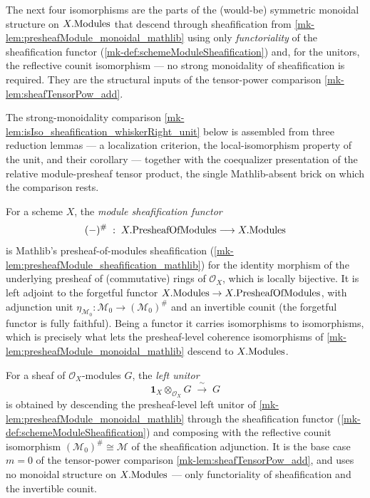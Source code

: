 The next four isomorphisms are the parts of the (would-be) symmetric monoidal
structure on \(X.\mathrm{Modules}\) that descend through sheafification from
\ref{mk-lem:presheafModule_monoidal_mathlib} using only \emph{functoriality} of the
sheafification functor (\ref{mk-def:schemeModuleSheafification}) and, for the
unitors, the reflective counit isomorphism --- no strong monoidality of
sheafification is required. They are the structural inputs of the tensor-power
comparison \ref{mk-lem:sheafTensorPow_add}.


The strong-monoidality comparison \ref{mk-lem:isIso_sheafification_whiskerRight_unit}
below is assembled from three reduction lemmas --- a localization criterion, the
local-isomorphism property of the unit, and their corollary --- together with the
coequalizer presentation of the relative module-presheaf tensor product, the single
Mathlib-absent brick on which the comparison rests.


\begin{definition}\label{mk-def:schemeModuleSheafification}
  \leanok

  For a scheme \(X\), the \emph{module sheafification functor}
  \[
    (-)^{\#} \;:\; X.\mathrm{PresheafOfModules} \longrightarrow X.\mathrm{Modules}
  \]
  is Mathlib's presheaf-of-modules sheafification
  (\ref{mk-lem:presheafModule_sheafification_mathlib}) for the identity morphism of
  the underlying presheaf of (commutative) rings of \(\mathcal{O}_X\), which is
  locally bijective. It is left adjoint to the forgetful functor
  \(X.\mathrm{Modules} \to X.\mathrm{PresheafOfModules}\), with adjunction unit
  \(\eta_{\mathcal{M}_0} : \mathcal{M}_0 \to (\mathcal{M}_0)^{\#}\) and an
  invertible counit (the forgetful functor is fully faithful). Being a functor it
  carries isomorphisms to isomorphisms, which is precisely what lets the
  presheaf-level coherence isomorphisms of
  \ref{mk-lem:presheafModule_monoidal_mathlib} descend to \(X.\mathrm{Modules}\).
\end{definition}

\begin{definition}\label{mk-def:tensorObjUnitIso}
  \leanok

  For a sheaf of \(\mathcal{O}_X\)-modules \(G\), the \emph{left unitor}
  \[
    \mathbf{1}_X \otimes_{\mathcal{O}_X} G \;\xrightarrow{\ \sim\ }\; G
  \]
  is obtained by descending the presheaf-level left unitor of
  \ref{mk-lem:presheafModule_monoidal_mathlib} through the sheafification functor
  (\ref{mk-def:schemeModuleSheafification}) and composing with the reflective counit
  isomorphism \((\mathcal{M}_0)^{\#} \cong \mathcal{M}\) of the sheafification
  adjunction. It is the base case \(m = 0\) of the tensor-power comparison
  \ref{mk-lem:sheafTensorPow_add}, and uses no monoidal structure on
  \(X.\mathrm{Modules}\) --- only functoriality of sheafification and the invertible
  counit.
\end{definition}

